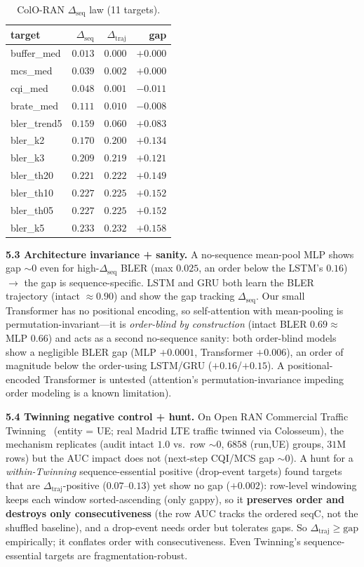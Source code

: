 \documentclass[conference]{IEEEtran}
\newcommand{\dseq}{\Delta_{\mathrm{seq}}}
\newcommand{\dtraj}{\Delta_{\mathrm{traj}}}
\begin{document}
\begin{table}[t]\centering\caption{ColO-RAN $\dseq$ law (11 targets).}\label{tab:law}
\begin{tabular}{lrrr}\toprule
target & $\dseq$ & $\dtraj$ & gap \\\midrule
buffer\_med & $0.013$ & $0.000$ & $+0.000$ \\
mcs\_med & $0.039$ & $0.002$ & $+0.000$ \\
cqi\_med & $0.048$ & $0.001$ & $-0.011$ \\
brate\_med & $0.111$ & $0.010$ & $-0.008$ \\
bler\_trend5 & $0.159$ & $0.060$ & $+0.083$ \\
bler\_k2 & $0.170$ & $0.200$ & $+0.134$ \\
bler\_k3 & $0.209$ & $0.219$ & $+0.121$ \\
bler\_th20 & $0.221$ & $0.222$ & $+0.149$ \\
bler\_th10 & $0.227$ & $0.225$ & $+0.152$ \\
bler\_th05 & $0.227$ & $0.225$ & $+0.152$ \\
bler\_k5 & $0.233$ & $0.232$ & $+0.158$ \\\bottomrule
\end{tabular}\end{table}

\textbf{5.3 Architecture invariance + sanity.} A no-sequence mean-pool MLP shows gap ${\sim}0$ even for
high-$\dseq$ BLER (max $0.025$, an order below the LSTM's $0.16$) $\rightarrow$ the gap is
sequence-specific. LSTM and GRU both learn the BLER trajectory (intact ${\approx}0.90$) and show the gap
tracking $\dseq$. Our small Transformer has no positional encoding, so self-attention with mean-pooling is
permutation-invariant---it is \emph{order-blind by construction} (intact BLER $0.69 \approx$ MLP $0.66$)
and acts as a second no-sequence sanity: both order-blind models show a negligible BLER gap (MLP $+0.0001$,
Transformer $+0.006$), an order of magnitude below the order-using LSTM/GRU ($+0.16$/$+0.15$). A
positional-encoded Transformer is untested (attention's permutation-invariance impeding order modeling is
a known limitation).

\textbf{5.4 Twinning negative control + hunt.}\label{sec:hunt} On Open RAN Commercial Traffic
Twinning~\cite{Twinning2024_dataset} (entity = UE; real Madrid LTE traffic twinned via Colosseum), the
mechanism replicates (audit intact $1.0$ vs.\ row ${\sim}0$, $6858$ (run,UE) groups, $31$M rows) but the
AUC impact does not (next-step CQI/MCS gap ${\sim}0$). A hunt for a \emph{within-Twinning}
sequence-essential positive (drop-event targets) found targets that are $\dtraj$-positive ($0.07$--$0.13$)
yet show no gap ($+0.002$): row-level windowing keeps each window sorted-ascending (only gappy), so it
\textbf{preserves order and destroys only consecutiveness} (the row AUC tracks the ordered seqC, not the
shuffled baseline), and a drop-event needs order but tolerates gaps. So $\dtraj \ge \text{gap}$
empirically; it conflates order with consecutiveness. Even Twinning's sequence-essential targets are
fragmentation-robust.
\end{document}
